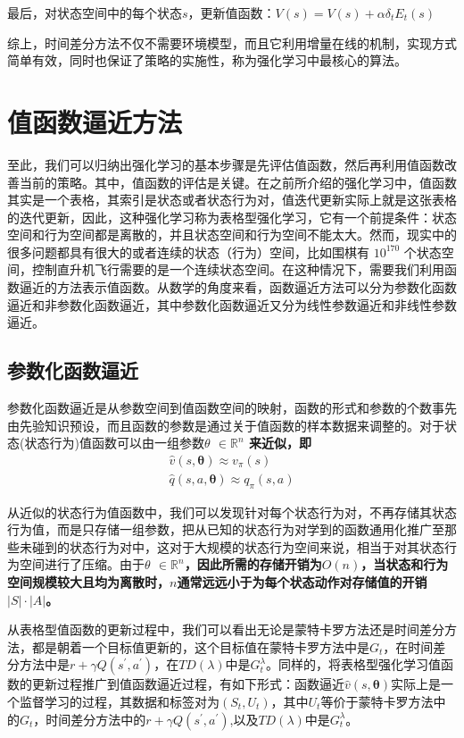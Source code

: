 最后，对状态空间中的每个状态$s$，更新值函数：$V(s)=V(s)+\alpha \delta_{t} E_{t}(s)$

综上，时间差分方法不仅不需要环境模型，而且它利用增量在线的机制，实现方式简单有效，同时也保证了策略的实施性，称为强化学习中最核心的算法。

\section{值函数逼近方法}
至此，我们可以归纳出强化学习的基本步骤是先评估值函数，然后再利用值函数改善当前的策略。其中，值函数的评估是关键。在之前所介绍的强化学习中，值函数其实是一个表格，其索引是状态或者状态行为对，值迭代更新实际上就是这张表格的迭代更新，因此，这种强化学习称为表格型强化学习，它有一个前提条件：状态空间和行为空间都是离散的，并且状态空间和行为空间不能太大。然而，现实中的很多问题都具有很大的或者连续的状态（行为）空间，比如围棋有 $10^{170}$  个状态空间，控制直升机飞行需要的是一个连续状态空间。在这种情况下，需要我们利用函数逼近的方法表示值函数。从数学的角度来看，函数逼近方法可以分为参数化函数逼近和非参数化函数逼近，其中参数化函数逼近又分为线性参数逼近和非线性参数逼近。

\subsection{参数化函数逼近}
参数化函数逼近是从参数空间到值函数空间的映射，函数的形式和参数的个数事先由先验知识预设，而且函数的参数是通过关于值函数的样本数据来调整的。对于状态(状态行为)值函数可以由一组参数\bfseries $\theta$ \mdseries $\in \mathbb{R}^{n} $ 来近似，即
\begin{displaymath}
\begin{aligned}
\hat{v}(s,\mathbf{\theta})\approx v_{\pi}(s)\\
\hat{q}(s,a,\mathbf{\theta})\approx q_{\pi}(s,a)
\end{aligned}
\end{displaymath}

从近似的状态行为值函数中，我们可以发现针对每个状态行为对，不再存储其状态行为值，而是只存储一组参数，把从已知的状态行为对学到的函数通用化推广至那些未碰到的状态行为对中，这对于大规模的状态行为空间来说，相当于对其状态行为空间进行了压缩。由于\bfseries $\theta$ \mdseries $\in \mathbb{R}^{n}$，因此所需的存储开销为$O(n)$，当状态和行为空间规模较大且均为离散时，$n$通常远远小于为每个状态动作对存储值的开销$|S|\cdot|A|$。

从表格型值函数的更新过程中，我们可以看出无论是蒙特卡罗方法还是时间差分方法，都是朝着一个目标值更新的，这个目标值在蒙特卡罗方法中是$G_{t}$，在时间差分方法中是$r+\gamma Q(s^{'},a^{'})$，在$TD(\lambda)$中是$G^{\lambda}_{t}$。同样的，将表格型强化学习值函数的更新过程推广到值函数逼近过程，有如下形式：函数逼近$\hat{v}(s,\mathbf{\theta})$实际上是一个监督学习的过程，其数据和标签对为$(S_{t}, U_{t})$，其中$U_{t}$等价于蒙特卡罗方法中的$G_{t}$，时间差分方法中的$r+\gamma Q(s^{'},a^{'})$,以及$TD(\lambda)$中是$G^{\lambda}_{t}$。

